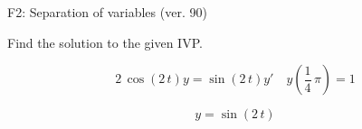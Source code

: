 \begin{exercise}
  \begin{exerciseTitle}F2: Separation of variables (ver. 90)\end{exerciseTitle}
  \begin{exerciseStatement}
    
Find the solution to the given IVP.

    
\[2 \, \cos\left(2 \, t\right) y= \sin\left(2 \, t\right) y'\hspace{1em} y\left( \frac{1}{4} \, \pi \right)= 1\]

  \end{exerciseStatement}
  \begin{exerciseAnswer}
    
\[y= \sin\left(2 \, t\right)\]

  \end{exerciseAnswer}
\end{exercise}